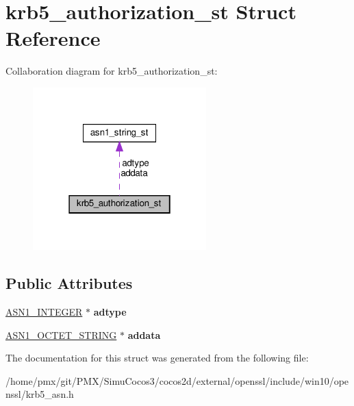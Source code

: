 \hypertarget{structkrb5__authorization__st}{}\section{krb5\+\_\+authorization\+\_\+st Struct Reference}
\label{structkrb5__authorization__st}


Collaboration diagram for krb5\+\_\+authorization\+\_\+st\+:
\nopagebreak
\begin{figure}[H]
\begin{center}
\leavevmode
\includegraphics[width=190pt]{structkrb5__authorization__st__coll__graph}
\end{center}
\end{figure}
\subsection*{Public Attributes}
\begin{DoxyCompactItemize}
\item 
\mbox{\label{structkrb5__authorization__st_a3e75f4cc0ea59482895df0c540561f82}} 
\hyperlink{structasn1__string__st}{A\+S\+N1\+\_\+\+I\+N\+T\+E\+G\+ER} $\ast$ {\bfseries adtype}
\item 
\mbox{\label{structkrb5__authorization__st_a26158edad70a1f032c0203033439a5cf}} 
\hyperlink{structasn1__string__st}{A\+S\+N1\+\_\+\+O\+C\+T\+E\+T\+\_\+\+S\+T\+R\+I\+NG} $\ast$ {\bfseries addata}
\end{DoxyCompactItemize}


The documentation for this struct was generated from the following file\+:\begin{DoxyCompactItemize}
\item 
/home/pmx/git/\+P\+M\+X/\+Simu\+Cocos3/cocos2d/external/openssl/include/win10/openssl/krb5\+\_\+asn.\+h\end{DoxyCompactItemize}
